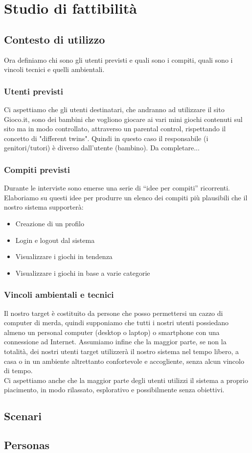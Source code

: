 \documentclass[../Report.tex]{subfiles}
\begin{document}
    \chapter{Studio di fattibilità}
    \section{Contesto di utilizzo}
        Ora definiamo chi sono gli utenti previsti e quali sono i compiti, quali sono i vincoli tecnici e quelli ambientali.\\
        
        \subsection{Utenti previsti}
        Ci aspettiamo che gli utenti destinatari, che andranno ad utilizzare il sito Gioco.it, sono dei bambini che vogliono giocare ai vari mini giochi contenuti sul sito ma in modo controllato, attraverso un parental control, rispettando il concetto di "different twins". Quindi in questo caso il responsabile (i genitori/tutori) è diverso dall'utente (bambino). Da completare...

        \subsection{Compiti previsti}
        Durante le interviste sono emerse una serie di “idee per compiti” ricorrenti. Elaboriamo su questi idee per produrre un elenco dei compiti più plausibili che il nostro sistema supporterà:
        \begin{itemize}
            \item Creazione di un profilo
            \item Login e logout dal sistema
            \item Visualizzare i giochi in tendenza
            \item Visualizzare i giochi in base a varie categorie
        \end{itemize}

        \subsection{Vincoli ambientali e tecnici}
        Il nostro target è costituito da persone che posso permettersi un cazzo di computer di merda, quindi supponiamo che tutti i nostri utenti possiedano almeno un personal computer (desktop o laptop) o smartphone con una connessione ad Internet.
        Assumiamo infine che la maggior parte, se non la totalità, dei nostri utenti target utilizzerà il nostro sistema nel tempo libero, a casa o in un ambiente altrettanto confortevole e accogliente, senza alcun vincolo di tempo.\\
        Ci aspettiamo anche che la maggior parte degli utenti utilizzi il sistema a proprio piacimento, in modo rilassato, esplorativo e possibilmente senza obiettivi.

    \section{Scenari}
    \section{Personas}
\end{document}
